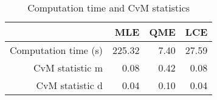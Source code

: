 \begin{table}[ht]
\centering
\begin{tabular}{rrrr}
  \hline
 & MLE & QME & LCE \\ 
  \hline
Computation time (s) & 225.32 & 7.40 & 27.59 \\ 
  CvM statistic m & 0.08 & 0.42 & 0.08 \\ 
  CvM statistic d & 0.04 & 0.10 & 0.04 \\ 
   \hline
\end{tabular}
\caption{Computation time and CvM statistics} 
\label{tab:cauchy:time:cvm}
\end{table}
